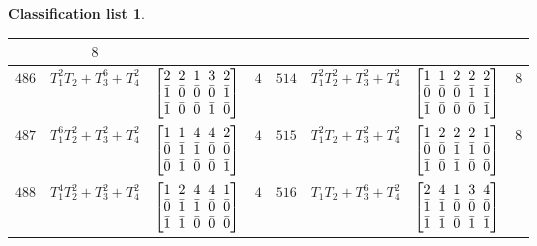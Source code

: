 \documentclass[pdftex]{sigma}%
\theoremstyle{definition}
\newtheorem{class-list}[thm]{Classification list}
\numberwithin{equation}{section}
\begin{document}
\begin{class-list}
\begin{table}[t!]
\begin{tabu}{c|c|c|c||c|c|c|c}
&${8}$
\\
\hline
${486}$&${T_{1}^{2}T_{2}+T_{3}^{6}+T_{4}^{2}}$&
$\arraycolsep=1mm\begin{bmatrix}{2} & {2} & {1} & {3} & {2} \\ {\bar{1}} & {\bar{0}} & {\bar{0}} & {\bar{0}} & {\bar{1}} \\ {\bar{1}} & {\bar{0}} & {\bar{0}} & {\bar{1}} & {\bar{0}}\end{bmatrix}$
&${4}$
&${514}$&${T_{1}^{2}T_{2}^{2}+T_{3}^{2}+T_{4}^{2}}$
&$\arraycolsep=1mm\begin{bmatrix}{1} & {1} & {2} & {2} & {2} \\ {\bar{0}} & {\bar{0}} & {\bar{0}} & {\bar{1}} & {\bar{1}} \\ {\bar{1}} & {\bar{0}} & {\bar{0}} & {\bar{0}} & {\bar{1}}\end{bmatrix}$
&${8}$
\\
\hline
${487}$&${T_{1}^{6}T_{2}^{2}+T_{3}^{2}+T_{4}^{2}}$
&$\arraycolsep=1mm\begin{bmatrix}{1} & {1} & {4} & {4} & {2} \\ {\bar{0}} & {\bar{1}} & {\bar{1}} & {\bar{0}} & {\bar{0}} \\ {\bar{0}} & {\bar{1}} & {\bar{0}} & {\bar{0}} & {\bar{1}}\end{bmatrix}$
&${4}$
&${515}$&${T_{1}^{2}T_{2}+T_{3}^{2}+T_{4}^{2}}$
&$\arraycolsep=1mm\begin{bmatrix}{1} & {2} & {2} & {2} & {1} \\ {\bar{0}} & {\bar{0}} & {\bar{1}} & {\bar{1}} & {\bar{0}} \\ {\bar{1}} & {\bar{0}} & {\bar{1}} & {\bar{0}} & {\bar{0}}\end{bmatrix}$
&${8}$
\\
\hline
${488}$&${T_{1}^{4}T_{2}^{2}+T_{3}^{2}+T_{4}^{2}}$
&$\arraycolsep=1mm\begin{bmatrix}{1} & {2} & {4} & {4} & {1} \\ {\bar{0}} & {\bar{1}} & {\bar{1}} & {\bar{0}} & {\bar{0}} \\ {\bar{1}} & {\bar{1}} & {\bar{0}} & {\bar{0}} & {\bar{0}}\end{bmatrix}$
&${4}$
&${516}$&${T_{1}T_{2}+T_{3}^{6}+T_{4}^{2}}$
&$\arraycolsep=1mm\begin{bmatrix}{2} & {4} & {1} & {3} & {4} \\ {\bar{1}} & {\bar{1}} & {\bar{0}} & {\bar{0}} & {\bar{0}} \\ {\bar{1}} & {\bar{1}} & {\bar{0}} & {\bar{1}} & {\bar{1}}\end{bmatrix}$

\end{tabu}
\end{table}
\end{class-list}
\end{document}
